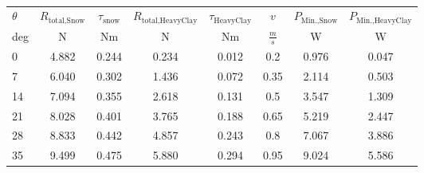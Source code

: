 \begin{table}[htb]
\centering
\caption{}
\begin{adjustbox}{max width=\textwidth}
\begin{tabular}[l]{lcccc|ccc}

	\toprule
		\multicolumn{1}{l}{\(\theta\)} & \multicolumn{1}{c}{\(R_\text{total,Snow}\)} & \multicolumn{1}{c}{\(\tau_\text{snow}\)} & \multicolumn{1}{c}{\(R_\text{total,HeavyClay}\)} & \multicolumn{1}{c|}{\(\tau_\text{HeavyClay}\)}	& \multicolumn{1}{c}{\(v\)}  & \multicolumn{1}{c}{\(P_\text{Min.,Snow}\)}  & \multicolumn{1}{c}{\(P_\text{Min.,HeavyClay}\)}			 \\
		
	\multicolumn{1}{l}{\:\:\:\:\:\: deg} & \multicolumn{1}{c}{N} & \multicolumn{1}{c}{Nm} & \multicolumn{1}{c}{N} & \multicolumn{1}{c|}{Nm} & \multicolumn{1}{c}{\(\frac{m}{s}\)} & \multicolumn{1}{c}{W} & \multicolumn{1}{c}{W} \\

	\midrule
		
	0	&	4.882	&	0.244	&	0.234	&	0.012	&	0.2		&	0.976	&	0.047	\\		
	7	&	6.040	&	0.302	&	1.436	&	0.072	&	0.35	&	2.114	&	0.503	\\
	14	&	7.094	&	0.355	&	2.618	&	0.131	&	0.5		&	3.547	&	1.309	\\
	21	&	8.028	&	0.401	&	3.765	&	0.188	&	0.65	&	5.219	&	2.447	\\
	28	&	8.833	&	0.442	&	4.857	&	0.243	&	0.8		&	7.067	&	3.886	\\
	35	&	9.499	&	0.475	&	5.880	&	0.294	&	0.95	&	9.024	&	5.586	\\
	
	\bottomrule

\end{tabular}
\end{adjustbox}
\label{tab:TorquePower}
\end{table}







\clearpage

\setcounter{figure}{0}
\setcounter{table}{0}

